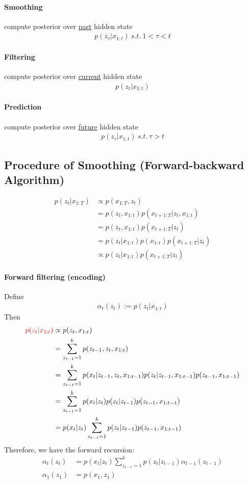 \documentclass{article}
\begin{document}
	\paragraph{Smoothing} compute posterior over \ul{past} hidden state
		\begin{align}
			p(z_\tau|x_{1:t})\ s.t.\ 1 < \tau < t
		\end{align}
	\paragraph{Filtering} compute posterior over \ul{current} hidden state
		\begin{align}
			p(z_t|x_{1:t})
		\end{align}
	\paragraph{Prediction} compute posterior over \ul{future} hidden state
		\begin{align}
			p(z_\tau|x_{1:t})\ s.t.\ \tau > t
		\end{align}
	
	\subsection{Procedure of Smoothing (Forward-backward Algorithm)}
	\begin{align}
		p(z_t | x_{1:T})
		&\propto p(x_{1:T}, z_t) \\
		&= p(z_t, x_{1:t}) p(x_{t+1:T}|z_t, x_{1:t}) \\
		&= p(z_t, x_{1:t}) p(x_{t+1:T}|z_t) \\
		&= p(z_t | x_{1:t}) p(x_{1:t}) p(x_{t+1:T}|z_t) \\
		&\propto  p(z_t | x_{1:t}) p(x_{t+1:T}|z_t)
	\end{align}
	
	\paragraph{Forward filtering (encoding)}
	Define
	\begin{align}
		\alpha_t(z_t) := p(z_t|x_{1:t})
	\end{align}
	Then
	\begin{align}
		\textcolor{red}{p(z_t | x_{1:t})}
		&\propto p(z_t, x_{1:t}) \\
		&= \sum_{z_{t-1}=1}^k p(z_{t-1}, z_t, x_{1:t}) \\
		&= \sum_{z_{t-1}=1}^k p(x_t|z_{t-1}, z_t, x_{1:t-1}) p(z_t | z_{t-1}, x_{1:t-1}) p(z_{t-1}, x_{1:t-1}) \\
		&= \sum_{z_{t-1}=1}^k p(x_t|z_t) p(z_t | z_{t-1}) p(z_{t-1}, x_{1:t-1}) \\
		&= p(x_t|z_t) \sum_{z_{t-1}=1}^k p(z_t | z_{t-1}) p(z_{t-1}, x_{1:t-1}) \\
	\end{align}
	Therefore, we have the forward recursion:
	\begin{align}
		\alpha_t(z_t) &= p(x_t|z_t) \sum_{z_{t-1}=1}^k p(z_t | z_{t-1}) \alpha_{t-1}(z_{t-1}) \\
		\alpha_1(z_1) &= p(x_1, z_1)
	\end{align}
	
\end{document}
